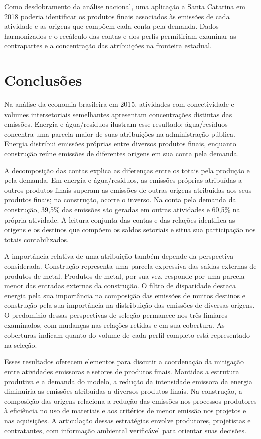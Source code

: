 \documentclass[11pt]{article}
\begin{document}
Como desdobramento da análise nacional, uma aplicação a Santa Catarina em 2018 poderia identificar os produtos finais associados às emissões de cada atividade e as origens que compõem cada conta pela demanda. Dados harmonizados e o recálculo das contas e dos perfis permitiriam examinar as contrapartes e a concentração das atribuições na fronteira estadual.

\clearpage
\section{Conclusões}

Na análise da economia brasileira em 2015, atividades com conectividade e volumes intersetoriais semelhantes apresentam concentrações distintas das emissões. Energia e água/resíduos ilustram esse resultado: água/resíduos concentra uma parcela maior de suas atribuições na administração pública. Energia distribui emissões próprias entre diversos produtos finais, enquanto construção reúne emissões de diferentes origens em sua conta pela demanda.

A decomposição das contas explica as diferenças entre os totais pela produção e pela demanda. Em energia e água/resíduos, as emissões próprias atribuídas a outros produtos finais superam as emissões de outras origens atribuídas aos seus produtos finais; na construção, ocorre o inverso. Na conta pela demanda da construção, 39,5\% das emissões são geradas em outras atividades e 60,5\% na própria atividade. A leitura conjunta das contas e das relações identifica as origens e os destinos que compõem os saldos setoriais e situa sua participação nos totais contabilizados.

A importância relativa de uma atribuição também depende da perspectiva considerada. Construção representa uma parcela expressiva das saídas externas de produtos de metal. Produtos de metal, por sua vez, responde por uma parcela menor das entradas externas da construção. O filtro de disparidade destaca energia pela sua importância na composição das emissões de muitos destinos e construção pela sua importância na distribuição das emissões de diversas origens. O predomínio dessas perspectivas de seleção permanece nos três limiares examinados, com mudanças nas relações retidas e em sua cobertura. As coberturas indicam quanto do volume de cada perfil completo está representado na seleção.

Esses resultados oferecem elementos para discutir a coordenação da mitigação entre atividades emissoras e setores de produtos finais. Mantidas a estrutura produtiva e a demanda do modelo, a redução da intensidade emissora da energia diminuiria as emissões atribuídas a diversos produtos finais. Na construção, a composição das origens relaciona a redução das emissões nos processos produtores à eficiência no uso de materiais e aos critérios de menor emissão nos projetos e nas aquisições. A articulação dessas estratégias envolve produtores, projetistas e contratantes, com informação ambiental verificável para orientar suas decisões.
\end{document}
